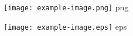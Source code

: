 \documentclass{article}
\begin{document}
\texttt{[image: example-image.png]} png

\texttt{[image: example-image.eps]} eps
\end{document}
